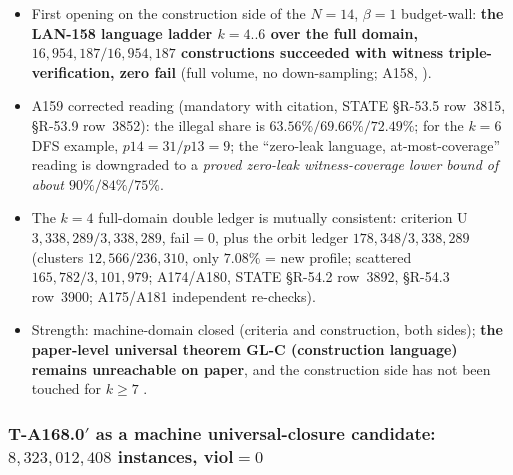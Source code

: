 \begin{itemize}
\item First opening on the construction side of the $N=14$, $\beta=1$
budget-wall: \textbf{the LAN-158 language ladder $k=4..6$ over the full
domain, $16{,}954{,}187/16{,}954{,}187$ constructions succeeded with
witness triple-verification, zero fail} (full volume, no down-sampling; A158,
).
\item A159 corrected reading (mandatory with citation, STATE \S R-53.5
row~3815, \S R-53.9 row~3852): the illegal share is
$63.56\%/69.66\%/72.49\%$; for the $k=6$ DFS example, $p14=31/p13=9$; the
``zero-leak language, at-most-coverage'' reading is downgraded to a
\emph{proved zero-leak witness-coverage lower bound of about
$90\%/84\%/75\%$}.
\item The $k=4$ full-domain double ledger is mutually consistent: criterion U
$3{,}338{,}289/3{,}338{,}289$, fail$=0$, plus the orbit ledger
$178{,}348/3{,}338{,}289$ (clusters $12{,}566/236{,}310$, only $7.08\%$ = new
profile; scattered $165{,}782/3{,}101{,}979$; A174/A180, STATE \S R-54.2
row~3892, \S R-54.3 row~3900; A175/A181 independent re-checks).
\item Strength: machine-domain closed (criteria and construction, both
sides); \textbf{the paper-level universal theorem GL-C (construction
language) remains unreachable on paper}, and the construction side has not
been touched for $k\ge7$ \openlab.
\end{itemize}

\subsubsection{T-A168.0$'$ as a machine universal-closure candidate:
$8{,}323{,}012{,}408$ instances, viol$=0$
\tierMUCC}\label{subsubsec:add-ta168}

